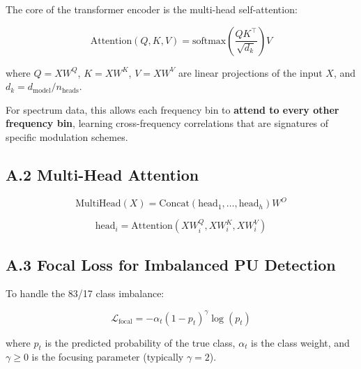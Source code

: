\documentclass[12pt, a4paper]{article}
\begin{document}
The core of the transformer encoder is the multi-head self-attention:

\begin{equation}
    \text{Attention}(Q, K, V) = \text{softmax}\left(\frac{QK^\top}{\sqrt{d_k}}\right) V
\end{equation}

where $Q = XW^Q$, $K = XW^K$, $V = XW^V$ are linear projections of the input $X$, and $d_k = d_\text{model} / n_\text{heads}$.

For spectrum data, this allows each frequency bin to \textbf{attend to every other frequency bin}, learning cross-frequency correlations that are signatures of specific modulation schemes.


\subsection*{A.2 Multi-Head Attention}

\begin{equation}
    \text{MultiHead}(X) = \text{Concat}(\text{head}_1, \ldots, \text{head}_h) W^O
\end{equation}

\begin{equation}
    \text{head}_i = \text{Attention}(XW^Q_i, XW^K_i, XW^V_i)
\end{equation}


\subsection*{A.3 Focal Loss for Imbalanced PU Detection}

To handle the 83/17 class imbalance:

\begin{equation}
    \mathcal{L}_\text{focal} = -\alpha_t (1 - p_t)^\gamma \log(p_t)
\end{equation}

where $p_t$ is the predicted probability of the true class, $\alpha_t$ is the class weight, and $\gamma \geq 0$ is the focusing parameter (typically $\gamma = 2$).
\end{document}
